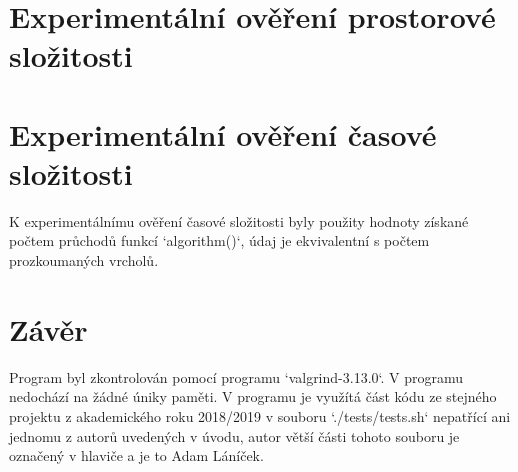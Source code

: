 \documentclass[a4paper,11pt]{article}
\begin{document}

\newpage
\section{Experimentální ověření prostorové složitosti}

\begin{figure}[h]
\centering
{}
\end{figure}


\section{Experimentální ověření časové složitosti}

K experimentálnímu ověření časové složitosti byly použity hodnoty získané počtem průchodů funkcí `algorithm()`, údaj je ekvivalentní s počtem prozkoumaných vrcholů.

\begin{figure}[h]
\centering
{}
\end{figure}
\newpage
\section{Závěr}

Program byl zkontrolován pomocí programu `valgrind-3.13.0`. V programu nedochází na žádné úniky paměti. V programu je využítá část kódu ze stejného projektu z akademického roku 2018/2019 v souboru `./tests/tests.sh` nepatřící ani jednomu z autorů uvedených v úvodu, autor větší části tohoto souboru je označený v hlaviče a je to Adam Láníček.






\end{document}
